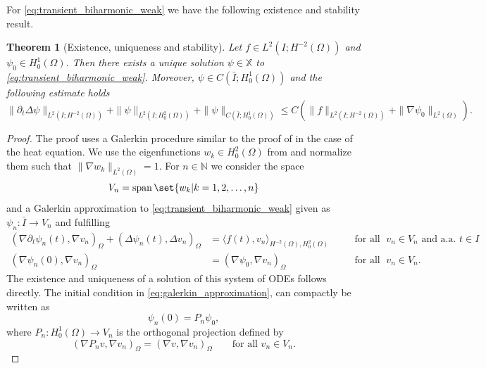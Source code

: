 \documentclass{m2an}
\newcommand{\1}{\mathds{1}}
\newcommand{\N}{\mathbb{N}}
\newcommand{\Om}{\Omega}
\newcommand{\na}{\nabla}
\newcommand{\Oprod}[1]{\left(#1\right)_{\Omega}}
\newcommand{\XX}{\mathbb{X}}
\newtheorem{theorem}{Theorem}[section]
\theoremstyle{definition}
\newcommand{\Cref}[1]{\zcref{#1}}
\begin{document}
For \eqref{eq:transient_biharmonic_weak} we have the following existence and stability result. 
\begin{theorem}[Existence, uniqueness and stability]\label{thm:existence_uniqueness_standard_regularity}
Let $f \in L^2(I;H^{-2}(\Om))$ and $\psi_0 \in H^1_0(\Om)$. Then there exists a unique solution $\psi\in \XX$ to \eqref{eq:transient_biharmonic_weak}. Moreover, $\psi\in C(\bar{I}; H^1_0(\Om))$ and the following estimate holds
$$
\|\partial_t \Delta \psi\|_{L^2(I;H^{-2}(\Omega))} 
+ \|\psi\|_{L^2(I;H^2_0(\Omega))}
+\|\psi\|_{C(\bar{I}; H^1_0(\Om))}\le C\left(\|f\|_{L^2(I;H^{-2}(\Om))}+\|\na \psi_0\|_{L^2(\Om)}\right).
$$
\end{theorem}
\begin{proof}
The proof uses a Galerkin procedure similar to the proof of \cite[Section 7.1.2, Theorem 3]{Evans:2010} in the case of the heat equation. We use the eigenfunctions $w_k \in H^2_0(\Omega)$ from \Cref{lemma:eigen} and normalize them such that $\|\nabla w_k\|_{L^2(\Omega)} = 1$. For $n \in \N$ we consider the space
\[
V_n = \operatorname{span}\set{w_k | k=1,2,\dots, n}
\] 
and a Galerkin approximation to \eqref{eq:transient_biharmonic_weak} given as $\psi_n \colon \bar I \to V_n$ and fulfilling
\begin{equation}\label{eq:galerkin_approximation}
\begin{aligned}
    \Oprod{\nabla \partial_t \psi_n(t), \nabla v_n} + \Oprod{\Delta \psi_n(t),\Delta v_n} 
    &= \langle f(t), v_n \rangle_{H^{-2}(\Omega),H^2_0(\Omega)} 
    \quad &&\text{for all }\; v_n \in V_n \text{ and a.a. } t \in I\\
\Oprod{\nabla \psi_n(0),\nabla v_n} &= \Oprod{\nabla \psi_0,\nabla v_n} \quad &&\text{for all }\; v_n \in V_n.
\end{aligned}
\end{equation}
The existence and uniqueness of a solution of this system of ODEs follows directly.
    The initial condition in \eqref{eq:galerkin_approximation}, can compactly be written as 
    \begin{equation}\label{eq:galerkin_approximation_initial_condition}
        \psi_n(0) = P_n \psi_0,
    \end{equation}
    where $P_n \colon H^1_0(\Omega) \to V_n$ is the orthogonal projection defined by
\begin{equation}\label{eq:definition_Pn}
\Oprod{\nabla P_n v,\nabla v_n} = \Oprod{\nabla v,\nabla v_n}
\qquad \text{for all  $v_n \in V_n$}.
\end{equation}

\end{proof}
\end{document}
